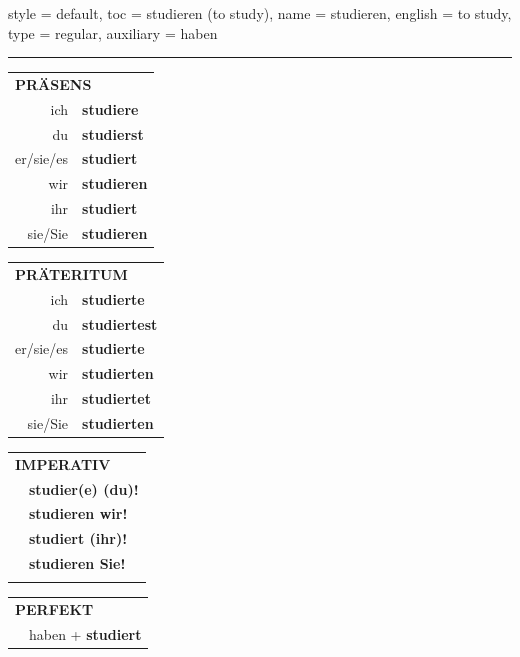 \begin{verbentry}{
  style = {default},
  toc = {studieren (to study)},
  name = {studieren},
  english = {to study},
  type = {regular},
  auxiliary = {haben}
}
 
    
     \vspace{5pt}

    \hrule
    
    \vspace{5pt}

  \begin{tabular}{rl}
     \multicolumn{2}{l}{\textbf{PRÄSENS} }\\
    ich & \textbf{studiere}\\
    du & \textbf{studierst}\\
    er/sie/es & \textbf{studiert}\\
    wir & \textbf{studieren}\\
    ihr & \textbf{studiert}\\
    sie/Sie & \textbf{studieren}\\
  \end{tabular}
  \hfill
     \begin{tabular}{rl}
    \multicolumn{2}{l}{\textbf{PRÄTERITUM} }\\
    ich & \textbf{studierte}\\
    du & \textbf{studiertest}\\
    er/sie/es & \textbf{studierte}\\
    wir & \textbf{studierten}\\
    ihr & \textbf{studiertet}\\
    sie/Sie & \textbf{studierten}\\
  \end{tabular}
  \hfill
  \begin{tabular}{rl}
     \multicolumn{2}{l}{\textbf{IMPERATIV} }\\
   & \textbf{studier(e) (du)!}\\
   & \textbf{studieren wir!}\\
   & \textbf{studiert (ihr)!}\\
   & \textbf{studieren Sie!}\\
   & \vspace{10pt}
  \end{tabular}

    \vspace{10pt}

 \begin{tabular}{rl}
     \multicolumn{2}{l}{\textbf{PERFEKT}}\\
   & haben + \textbf{studiert}\\
  \end{tabular}
\hfill
   \begin{tabular}{rl}
   

\end{tabular}
\end{verbentry}
